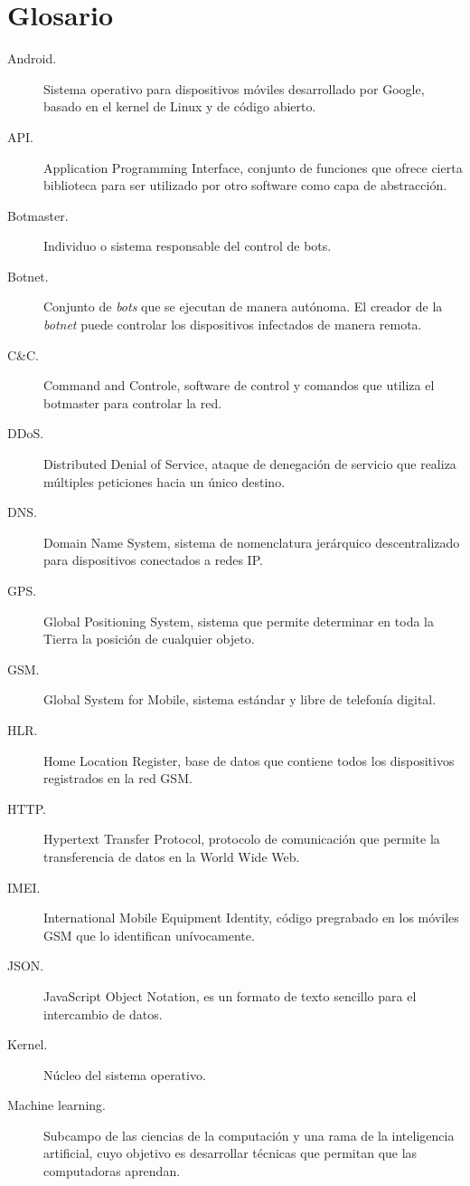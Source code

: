 \documentclass[a4paper,11pt]{report}
\begin{document}
\chapter{Glosario} \label{glosario}

\begin{description}
\item[Android.] Sistema operativo para dispositivos móviles desarrollado por Google, basado en el kernel de Linux y de código abierto.
\item[API.] Application Programming Interface, conjunto de funciones que ofrece cierta biblioteca para ser utilizado por otro software como capa de abstracción.
\item[Botmaster.]  Individuo o sistema responsable del control de bots.
\item[Botnet.] Conjunto de \emph{bots} que se ejecutan de manera autónoma. El creador de la \emph{botnet} puede controlar los dispositivos infectados de manera remota.
\item[C\&{}C.] Command and Controle, software de control y comandos que utiliza el botmaster para controlar la red.
\item[DDoS.] Distributed Denial of Service, ataque de denegación de servicio que realiza múltiples peticiones hacia un único destino.
\item[DNS.] Domain Name System, sistema de nomenclatura jerárquico descentralizado para dispositivos conectados a redes IP.
\item[GPS.] Global Positioning System, sistema que permite determinar en toda la Tierra la posición de cualquier objeto. 
\item[GSM.] Global System for Mobile, sistema estándar y libre de telefonía digital.
\item[HLR.] Home Location Register, base de datos que contiene todos los dispositivos registrados en la red GSM.
\item[HTTP.] Hypertext Transfer Protocol, protocolo de comunicación que permite la transferencia de datos en la World Wide Web.
\item[IMEI.] International Mobile Equipment Identity, código pregrabado en los móviles GSM que lo identifican unívocamente.
\item[JSON.] JavaScript Object Notation, es un formato de texto sencillo para el intercambio de datos.
\item[Kernel.] Núcleo del sistema operativo.
\item[Machine learning.] Subcampo de las ciencias de la computación y una rama de la inteligencia artificial, cuyo objetivo es desarrollar técnicas que permitan que las computadoras aprendan. 

\end{description}
\end{document}
